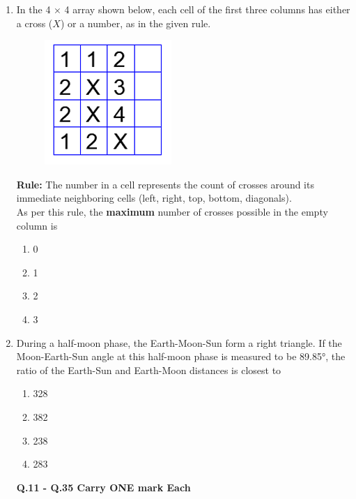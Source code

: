 \documentclass[a4paper,12pt]{exam}
\numberwithin{equation}{enumi}
\numberwithin{figure}{enumi}
\begin{document}
\begin{enumerate}
\item In the 4 × 4 array shown below, each cell of the first three columns has either a cross ($X$) or a number, as in the given rule. 

\begin{figure}[h]
\centering
\includegraphics[width=0.25\columnwidth]{figs/Q9.png}
\label{fig:Q9.png}
\end{figure}

\textbf{Rule:} The number in a cell represents the count of crosses around its immediate neighboring cells (left, right, top, bottom, diagonals).\\ As per this rule, the \textbf{maximum} number of crosses possible in the empty column is 

\hfill{}

\begin{multicols}{4}
\begin{enumerate}
    \item 0
    \item 1
    \item 2
    \item 3
\end{enumerate}
\end{multicols}

\item During a half-moon phase, the Earth-Moon-Sun form a right triangle. If the  Moon-Earth-Sun angle at this half-moon phase is measured to be 89.85°, the ratio  of the Earth-Sun and Earth-Moon distances is closest to

\hfill{}

\begin{multicols}{4}
\begin{enumerate}
 \item 328
\item 382
\item 238
\item 283
\end{enumerate}
\end{multicols}

\textbf{Q.11 - Q.35 Carry ONE mark Each}
\vspace{0.25cm}


\end{enumerate}
\end{document}
